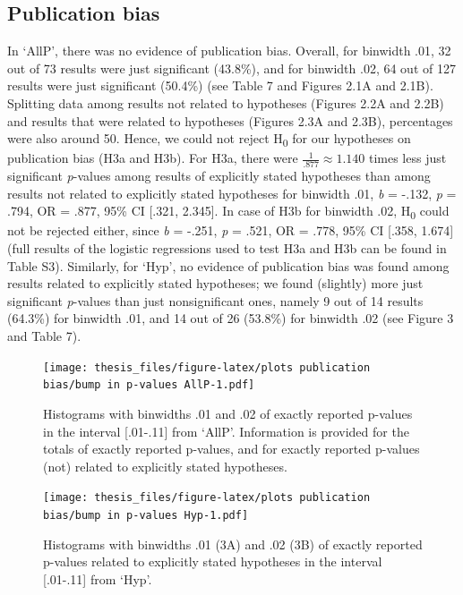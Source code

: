 \documentclass[
  12pt,
]{article}
\begin{document}
\hypertarget{publication-bias}{%
\subsection{Publication bias}\label{publication-bias}}

In `AllP', there was no evidence of publication bias. Overall, for
binwidth .01, 32 out of 73 results were just significant (43.8\%), and
for binwidth .02, 64 out of 127 results were just significant (50.4\%)
(see Table 7 and Figures 2.1A and 2.1B). Splitting data among results
not related to hypotheses (Figures 2.2A and 2.2B) and results that were
related to hypotheses (Figures 2.3A and 2.3B), percentages were also
around 50. Hence, we could not reject H\textsubscript{0} for our
hypotheses on publication bias (H3a and H3b). For H3a, there were
\(\frac{1}{.877} \approx 1.140\) times less just significant
\emph{p}-values among results of explicitly stated hypotheses than among
results not related to explicitly stated hypotheses for binwidth .01,
\emph{b} = -.132, \emph{p} = .794, OR = .877, 95\% CI {[}.321, 2.345{]}.
In case of H3b for binwidth .02, H\textsubscript{0} could not be
rejected either, since \emph{b} = -.251, \emph{p} = .521, OR = .778,
95\% CI {[}.358, 1.674{]} (full results of the logistic regressions used
to test H3a and H3b can be found in Table S3). Similarly, for `Hyp', no
evidence of publication bias was found among results related to
explicitly stated hypotheses; we found (slightly) more just significant
\emph{p}-values than just nonsignificant ones, namely 9 out of 14
results (64.3\%) for binwidth .01, and 14 out of 26 (53.8\%) for
binwidth .02 (see Figure 3 and Table 7).

\begin{figure}
\centering
\texttt{[image: thesis\_files/figure-latex/plots publication bias/bump in p-values AllP-1.pdf]}
\caption{Histograms with binwidths .01 and .02 of exactly reported
p-values in the interval {[}.01-.11{]} from `AllP'. Information is
provided for the totals of exactly reported p-values, and for exactly
reported p-values (not) related to explicitly stated hypotheses.}
\end{figure}

\begin{figure}
\centering
\texttt{[image: thesis\_files/figure-latex/plots publication bias/bump in p-values Hyp-1.pdf]}
\caption{Histograms with binwidths .01 (3A) and .02 (3B) of exactly
reported p-values related to explicitly stated hypotheses in the
interval {[}.01-.11{]} from `Hyp'.}
\end{figure}
\end{document}

